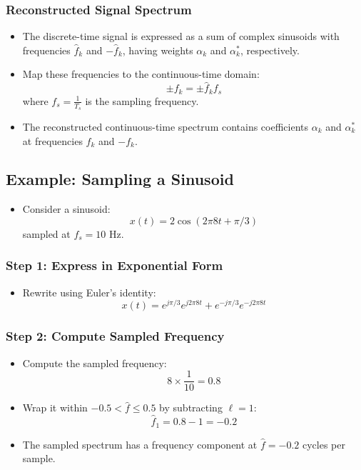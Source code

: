 \documentclass[12pt, letterpaper]{article}
\begin{document}
\subsubsection{Reconstructed Signal Spectrum}
\begin{itemize}
    \item The discrete-time signal is expressed as a sum of complex sinusoids with frequencies \( \hat{f}_k \) and \( -\hat{f}_k \), having weights \( \alpha_k \) and \( \alpha_k^* \), respectively.
    \item Map these frequencies to the continuous-time domain:
    \[
    \pm f_k = \pm \hat{f}_k f_s
    \]
    where \( f_s = \frac{1}{T_s} \) is the sampling frequency.
    \item The reconstructed continuous-time spectrum contains coefficients \( \alpha_k \) and \( \alpha_k^* \) at frequencies \( f_k \) and \( -f_k \).
\end{itemize}

\subsection{Example: Sampling a Sinusoid}
\begin{itemize}
    \item Consider a sinusoid:
    \[
    x(t) = 2 \cos(2\pi 8t + \pi/3)
    \]
    sampled at \( f_s = 10 \) Hz.
\end{itemize}

\subsubsection{Step 1: Express in Exponential Form}
\begin{itemize}
    \item Rewrite using Euler’s identity:
    \[
    x(t) = e^{j\pi/3} e^{j 2\pi 8t} + e^{-j\pi/3} e^{-j 2\pi 8t}
    \]
\end{itemize}

\subsubsection{Step 2: Compute Sampled Frequency}
\begin{itemize}
    \item Compute the sampled frequency:
    \[
    8 \times \frac{1}{10} = 0.8
    \]
    \item Wrap it within \( -0.5 < \hat{f} \leq 0.5 \) by subtracting \( \ell = 1 \):
    \[
    \hat{f}_1 = 0.8 - 1 = -0.2
    \]
    \item The sampled spectrum has a frequency component at \( \hat{f} = -0.2 \) cycles per sample.
\end{itemize}
\end{document}
